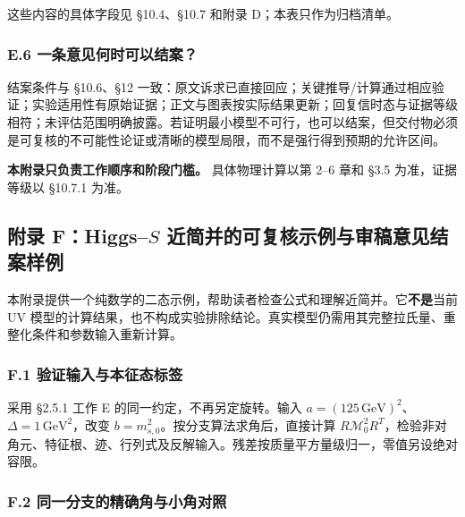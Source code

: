 \documentclass[
]{article}
\begin{document}
这些内容的具体字段见 §10.4、§10.7 和附录 D；本表只作为归档清单。

\subsubsection{E.6
一条意见何时可以结案？}\label{e.6-ux4e00ux6761ux610fux89c1ux4f55ux65f6ux53efux4ee5ux7ed3ux6848}

结案条件与 §10.6、§12
一致：原文诉求已直接回应；关键推导/计算通过相应验证；实验适用性有原始证据；正文与图表按实际结果更新；回复信时态与证据等级相符；未评估范围明确披露。若证明最小模型不可行，也可以结案，但交付物必须是可复核的不可能性论证或清晰的模型局限，而不是强行得到预期的允许区间。

\textbf{本附录只负责工作顺序和阶段门槛。} 具体物理计算以第 2--6 章和
§3.5 为准，证据等级以 §10.7.1 为准。

\subsection{\texorpdfstring{附录 F：Higgs--\(S\)
近简并的可复核示例与审稿意见结案样例}{附录 F：Higgs--S 近简并的可复核示例与审稿意见结案样例}}\label{ux9644ux5f55-fhiggss-ux8fd1ux7b80ux5e76ux7684ux53efux590dux6838ux793aux4f8bux4e0eux5ba1ux7a3fux610fux89c1ux7ed3ux6848ux6837ux4f8b}

本附录提供一个纯数学的二态示例，帮助读者检查公式和理解近简并。它\textbf{不是}当前
UV
模型的计算结果，也不构成实验排除结论。真实模型仍需用其完整拉氏量、重整化条件和参数输入重新计算。

\subsubsection{F.1
验证输入与本征态标签}\label{f.1-ux9a8cux8bc1ux8f93ux5165ux4e0eux672cux5f81ux6001ux6807ux7b7e}

采用 §2.5.1 工作 E 的同一约定，不再另定旋转。输入
\(a=(125\,\mathrm{GeV})^2\)、\(\Delta=1\,\mathrm{GeV}^2\)，改变
\(b=m_{s,0}^2\)。按分支算法求角后，直接计算
\(R\mathcal M_0^2R^T\)，检验非对角元、特征根、迹、行列式及反解输入。残差按质量平方量级归一，零值另设绝对容限。

\subsubsection{F.2
同一分支的精确角与小角对照}\label{f.2-ux540cux4e00ux5206ux652fux7684ux7cbeux786eux89d2ux4e0eux5c0fux89d2ux5bf9ux7167}
\end{document}
